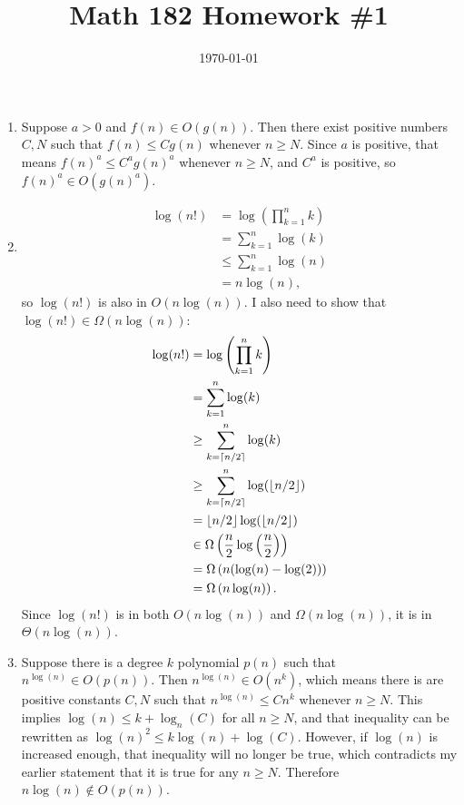 \documentclass{article}
\date{\today}
\title{Math 182 Homework \#1}
\begin{document}
\maketitle

\begin{prob}
\end{prob}
\begin{enumerate}[label=(\alph*)]
    \item Suppose $a>0$ and $f(n) \in O(g(n))$. Then there exist positive numbers $C, N$ such that $f(n) \leq C g(n)$ whenever $n \geq N$. Since $a$ is positive, that means $f(n)^a \leq C^a g(n)^a$ whenever $n \geq N$, and $C^a$ is positive, so $f(n)^a \in O(g(n)^a)$.
    \item \begin{align*}
            \log(n!) &= \log \left( \prod_{k=1}^n k \right) \\
                     &= \sum_{k=1}^n \log(k) \\
                     &\leq \sum_{k=1}^n \log(n) \\
                     &= n \log(n),
    \end{align*}
    so $\log(n!)$ is also in $O(n \log(n))$. I also need to show that $\log(n!) \in \Omega(n \log(n))$: \begin{align*}
            \log(n!) &= \log \left( \prod_{k=1}^n k \right) \\
                     &= \sum_{k=1}^n \log(k) \\
                     &\geq \sum_{k=\left\lceil n/2 \right\rceil}^n \log(k) \\
                     &\geq \sum_{k=\left\lceil n/2 \right\rceil}^n \log(\left\lfloor n/2 \right\rfloor) \\
                     &= \left\lfloor n/2 \right\rfloor \log(\left\lfloor n/2 \right\rfloor) \\
                     &\in \Omega \left( \frac{n}{2} \log \left( \frac{n}{2} \right) \right) \\
                     &= \Omega \left( n (\log(n)-\log(2)) \right) \\
                     &= \Omega \left( n \log(n) \right).
    \end{align*}
    Since $\log(n!)$ is in both $O(n \log(n))$ and $\Omega(n \log(n))$, it is in $\Theta(n \log(n))$.
\item Suppose there is a degree $k$ polynomial $p(n)$ such that $n^{\log(n)} \in O(p(n))$. Then $n^{\log(n)} \in O(n^k)$, which means there is are positive constants $C, N$ such that $n^{\log(n)} \leq C n^k$ whenever $n \geq N$. This implies $\log(n) \leq k + \log_n(C)$ for all $n \geq N$, and that inequality can be rewritten as $\log(n)^2 \leq k \log(n) + \log(C)$. However, if $\log(n)$ is increased enough, that inequality will no longer be true, which contradicts my earlier statement that it is true for any $n \geq N$. Therefore $n \log(n) \not\in O(p(n))$.
\end{enumerate}
\end{document}
